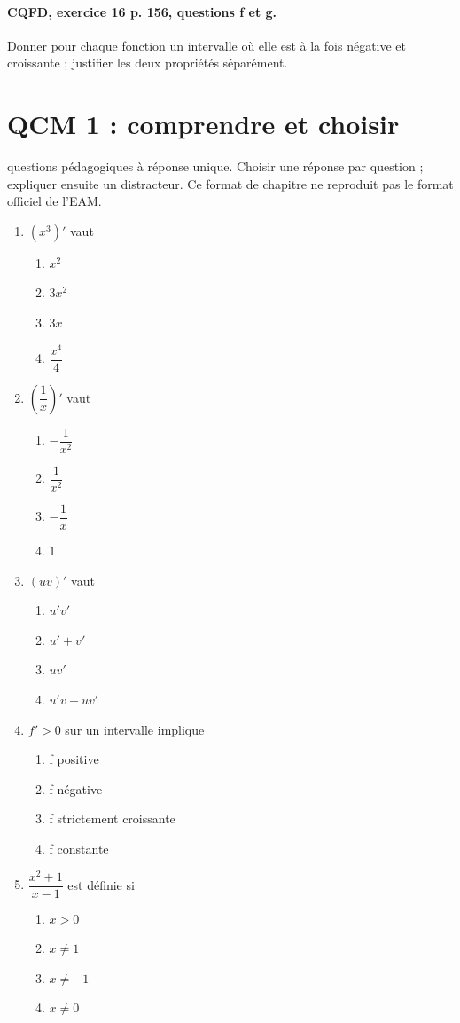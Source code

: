 \paragraph{CQFD, exercice 16 p. 156, questions f et g.}\label{C06-M2} Donner pour chaque fonction un intervalle où elle est à la fois négative et croissante ; justifier les deux propriétés séparément.
\begingroup\small
\mxnewpage\section*{QCM 1 : comprendre et choisir}\label{C06-Q1}
 questions pédagogiques à réponse unique. Choisir une réponse par question ; expliquer ensuite un distracteur. Ce format de chapitre ne reproduit pas le format officiel de l’EAM.
\begin{enumerate}
\item $(x^3)\prime$ vaut
\begin{enumerate}[label=\Alph*.,itemsep=2pt]
\item $x^2$
\item $3x^2$
\item $3x$
\item $\dfrac{x^4}{4}$
\end{enumerate}
\item $(\dfrac{1}{x})\prime $ vaut
\begin{enumerate}[label=\Alph*.,itemsep=2pt]
\item $-\dfrac{1}{x^2}$
\item $\dfrac{1}{x^2}$
\item $-\dfrac{1}{x}$
\item $1$
\end{enumerate}
\item $(uv)\prime$ vaut
\begin{enumerate}[label=\Alph*.,itemsep=2pt]
\item $u\prime v\prime$
\item $u\prime+v\prime$
\item $uv\prime$
\item $u\prime v+uv\prime$
\end{enumerate}
\item $f\prime>0$ sur un intervalle implique
\begin{enumerate}[label=\Alph*.,itemsep=2pt]
\item f positive
\item f négative
\item f strictement croissante
\item f constante
\end{enumerate}
\item $\dfrac{x^2+1}{x-1}$ est définie si
\begin{enumerate}[label=\Alph*.,itemsep=2pt]
\item $x>0$
\item $x\ne1$
\item $x\ne-1$
\item $x\ne0$
\end{enumerate}
\end{enumerate}
